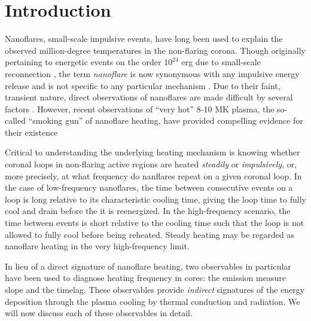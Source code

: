 \section{Introduction}\label{introduction}

Nanoflares, small-scale impulsive events, have long been used to explain the observed million-degree temperatures in the non-flaring corona. Though originally pertaining to energetic events on the order $10^{24}$ erg due to small-scale reconnection \citep{parker_nanoflares_1988}, the term \textit{nanoflare} is now synonymous with any impulsive energy release and is not specific to any particular mechanism \citep{klimchuk_key_2015}. Due to their faint, transient nature, direct observations of nanoflares are made difficult by several factors \citep{winebarger_defining_2012,barnes_inference_2016}. However, recent observations of ``very hot'' 8-10 MK plasma, the so-called ``smoking gun'' of nanoflare heating, have provided compelling evidence for their existence \citep[e.g.][]{brosius_pervasive_2014,caspi_new_2015,parenti_spectroscopy_2017,ishikawa_detection_2017}

Critical to understanding the underlying heating mechanism is knowing whether coronal loops in non-flaring active regions are heated \textit{steadily} or \textit{impulsively}, or, more precisely, at what frequency do nanflares repeat on a given coronal loop. In the case of low-frequency nanoflares, the time between consecutive events on a loop is long relative to its characteristic cooling time, giving the loop time to fully cool and drain before the it is reenergized. In the high-frequency scenario, the time between events is short relative to the cooling time such that the loop is not allowed to fully cool before being reheated. Steady heating may be regarded as nanoflare heating in the very high-frequency limit.

In lieu of a direct signature of nanoflare heating, two observables in particular have been used to diagnose heating frequency in \AR{} cores: the emission measure slope and the timelag. These observables provide \textit{indirect} signatures of the energy deposition through the plasma cooling by thermal conduction and radiation. We will now discuss each of these observables in detail.

